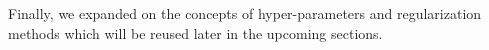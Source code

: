 Finally, we expanded on the concepts of hyper-parameters and regularization methods which will be reused later in the upcoming sections.


%

